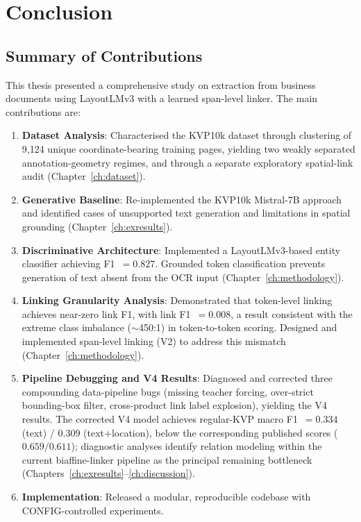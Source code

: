 \chapter{Conclusion}
\label{ch:conclusion}

\section{Summary of Contributions}
\label{sec:summary}

This thesis presented a comprehensive study on \kvp{} extraction from business
documents using LayoutLMv3 with a learned span-level linker. The main
contributions are:

\begin{enumerate}
    \item \textbf{Dataset Analysis}: Characterised the KVP10k dataset through
    clustering of 9{,}124 unique coordinate-bearing training pages, yielding
    two weakly separated annotation-geometry regimes, and through a separate
    exploratory spatial-link audit (Chapter~\ref{ch:dataset}).

    \item \textbf{Generative Baseline}: Re-implemented the KVP10k Mistral-7B
    approach and identified cases of unsupported text generation and
    limitations in spatial grounding (Chapter~\ref{ch:exresults}).

    \item \textbf{Discriminative Architecture}: Implemented a LayoutLMv3-based
    entity classifier achieving F1~$= 0.827$. Grounded token classification
    prevents generation of text absent from the OCR input
    (Chapter~\ref{ch:methodology}).

    \item \textbf{Linking Granularity Analysis}: Demonstrated that token-level
    linking achieves near-zero link F1, with link F1~$= 0.008$, a result consistent with
    the extreme class imbalance ($\sim$450:1) in token-to-token scoring.
    Designed and implemented span-level linking (V2) to address this mismatch
    (Chapter~\ref{ch:methodology}).

    \item \textbf{Pipeline Debugging and V4 Results}: Diagnosed and corrected
    three compounding data-pipeline bugs (missing teacher forcing, over-strict
    bounding-box filter, cross-product link label explosion), yielding the V4
    results. The corrected V4 model achieves regular-KVP macro
    F1~$=0.334$ (text) / $0.309$ (text+location), below the corresponding
    published scores ($0.659/0.611$); diagnostic analyses identify relation
    modeling within the current biaffine-linker pipeline as the principal
    remaining bottleneck (Chapters~\ref{ch:exresults}--\ref{ch:discussion}).

    \item \textbf{Implementation}: Released a modular, reproducible codebase
    with CONFIG-controlled experiments.
\end{enumerate}

